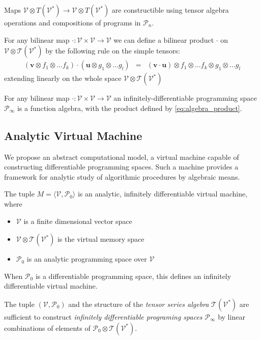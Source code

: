 \documentclass[11pt]{article}
\newcommand{\T}{\mathcal{T}}
\newcommand{\VV}{\mathcal{V}}
\newcommand{\uu}{\mathbf{u}}
\newcommand{\vv}{\mathbf{v}}
\newcommand{\dP}{\mathcal{P}}
\begin{document}
       \begin{remark}\label{rem:vTen}
       Maps $\VV\otimes T(\VV^*)\to \VV\otimes T(\VV^*)$ are constructible using
       tensor algebra operations and compositions of programs in $\dP_n$.
       \end{remark}
       
 

\begin{definition}
 For any bilinear map $\cdot :\VV\times \VV\to \VV$ we can define a
 bilinear product $\cdot$ on $\VV\otimes \T(\VV^*)$ by the following rule on the
 simple tensors:
 \begin{eqnarray}
   \label{eq:algebra_product}
   (\vv\otimes f_1\otimes\ldots f_k) \cdot (\uu\otimes g_1\otimes\ldots g_l) &=& 
(\vv\cdot \uu)\otimes f_1\otimes\ldots f_k\otimes g_1\otimes\ldots g_l 
 \end{eqnarray}
extending linearly on the whole space $\VV\otimes\T(\VV^*)$
\end{definition}
\begin{theorem}\label{izr:alg}
 For any bilinear map $\cdot :\VV\times \VV\to \VV$ an infinitely-differentiable
 programming space $\dP_\infty$ is a function algebra, with the product defined
 by \eqref{eq:algebra_product}.
\end{theorem}

\subsection{Analytic Virtual Machine}

We propose an abstract computational model, a virtual machine capable of
constructing differentiable programming spaces. Such a machine provides a
framework for analytic study of algorithmic procedures by algebraic means. 



\begin{definition}\label{def:analyticMachine}
The tuple $M=\langle \VV,\dP_0\rangle$ is an analytic, infinitely  differentiable virtual machine, where
   
    \begin{itemize}
    \item
    $\VV$ is a finite dimensional vector space
    \item
    $\VV\otimes \T(\VV^*)$ is the virtual memory space
    \item
    $\dP_0$ is an analytic programming space over $\VV$
    \end{itemize}
    When $\dP_0$ is a differentiable programming space, this defines an
    infinitely differentiable virtual machine.
  \end{definition}
\begin{remark}
The tuple  $(\VV,\dP_0)$ and the structure of the \emph{tensor series algebra}
$\T(\VV^*)$ are sufficient to construct \emph{infinitely differentiable
  programing spaces} $\dP_\infty$ by linear combinations of elements of
$\dP_0\otimes \T(\VV^*)$. 
\end{remark}
\end{document}
